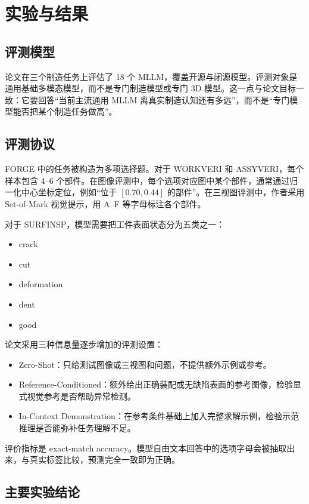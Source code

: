 \section{实验与结果}

\subsection{评测模型}

论文在三个制造任务上评估了 18 个 MLLM，覆盖开源与闭源模型。评测对象是通用基础多模态模型，而不是专门制造模型或专门 3D 模型。这一点与论文目标一致：它要回答“当前主流通用 MLLM 离真实制造认知还有多远”，而不是“专门模型能否把某个制造任务做高”。

\subsection{评测协议}

FORGE 中的任务被构造为多项选择题。对于 WORKVERI 和 ASSYVERI，每个样本包含 4--6 个部件。在图像评测中，每个选项对应图中某个部件，通常通过归一化中心坐标定位，例如“位于 $[0.70,0.44]$ 的部件”。在三视图评测中，作者采用 Set-of-Mark 视觉提示，用 A--F 等字母标注各个部件。

对于 SURFINSP，模型需要把工件表面状态分为五类之一：

\begin{itemize}
    \item crack
    \item cut
    \item deformation
    \item dent
    \item good
\end{itemize}

论文采用三种信息量逐步增加的评测设置：

\begin{itemize}
    \item Zero-Shot：只给测试图像或三视图和问题，不提供额外示例或参考。
    \item Reference-Conditioned：额外给出正确装配或无缺陷表面的参考图像，检验显式视觉参考是否帮助异常检测。
    \item In-Context Demonstration：在参考条件基础上加入完整求解示例，检验示范推理是否能弥补任务理解不足。
\end{itemize}

评价指标是 exact-match accuracy。模型自由文本回答中的选项字母会被抽取出来，与真实标签比较，预测完全一致即为正确。

\subsection{主要实验结论}

